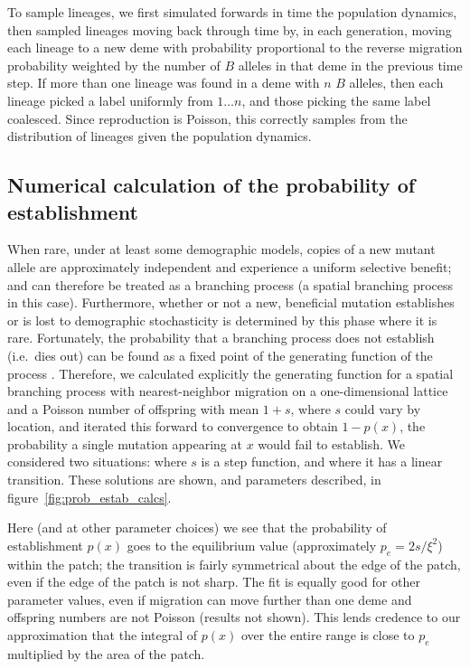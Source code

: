 \documentclass{article}
\newcommand{\citep}[1]{\cite{#1}}
\begin{document}
To sample lineages, we first simulated forwards in time the population dynamics,
then sampled lineages moving back through time
by, in each generation,
moving each lineage to a new deme with probability proportional to the reverse migration probability
weighted by the number of $B$ alleles in that deme in the previous time step.
If more than one lineage was found in a deme with $n$ $B$ alleles,
then each lineage picked a label uniformly from $1 \ldots n$,
and those picking the same label coalesced.
Since reproduction is Poisson, this correctly samples from the distribution of lineages given the population dynamics.

\subsection[Probability of Establishment]{Numerical calculation of the probability of establishment}
\label{apx:establishment_sims}

When rare, under at least some demographic models,
copies of a new mutant allele are approximately independent and experience a uniform selective benefit;
and can therefore be treated as a branching process (a spatial branching process in this case).
Furthermore, whether or not a new, beneficial mutation establishes or is lost to demographic stochasticity
is determined by this phase where it is rare.
Fortunately, the probability that a branching process does not establish
(i.e.\ dies out)
can be found as a fixed point of the generating function of the process \citep{jagers1975branching}.
Therefore, we calculated explicitly the generating function for a spatial branching process
with nearest-neighbor migration on a one-dimensional lattice
and a Poisson number of offspring with mean $1+s$,
where $s$ could vary by location,
and iterated this forward to convergence to obtain $1-p(x)$, the probability a single mutation appearing at $x$ would fail to establish.
We considered two situations:
where $s$ is a step function,
and where it has a linear transition.
These solutions are shown, and parameters described, in figure~\ref{fig:prob_estab_calcs}.

Here (and at other parameter choices) we see that the probability of establishment $p(x)$ goes to the equilibrium value
(approximately $p_e = 2s/\xi^2$) within the patch;
the transition is fairly symmetrical about the edge of the patch, even if the edge of the patch is not sharp.
The fit is equally good for other parameter values,
even if migration can move further than one deme and offspring numbers are not Poisson (results not shown).
This lends credence to our approximation that the integral of $p(x)$ over the entire range
is close to $p_e$ multiplied by the area of the patch.
\end{document}
